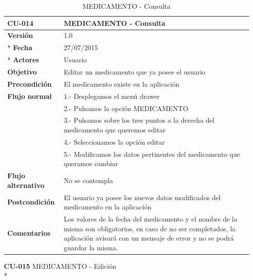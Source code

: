 \documentclass[../pfc.tex]{subfiles}
\begin{document}
		\begin{table}[H]
			\centering
			\begin{tabular}[t]{|p{3cm}|p{9.5cm}|}
				\hline \textbf{CU-014} & \textbf{MEDICAMENTO - Consulta} \\*
				\hline\hline \textbf{Versión} & 1.0 \\ *
				\hline\hline \textbf{Fecha} & 27/07/2015 \\ *
				\hline\textbf{Actores} 	& Usuario\\*
				\hline \textbf{Objetivo} & Editar un medicamento que ya posee el usuario\\* 			
				\hline \textbf{Precondición} & El medicamento existe en la aplicación\\* 
				\hline \textbf{Flujo normal} & 1.- Desplegamos el menú drawer \\* 
				& 2.- Pulsamos la opción MEDICAMENTO\\*	
				& 3.- Pulsamos sobre los tres puntos a la derecha del medicamento que queremos editar\\*	
				& 4.- Seleccionamos la opción editar\\*	
				& 5.- Modificamos los datos pertinentes del medicamento que queramos cambiar\\*	
				\hline \textbf{Flujo alternativo} & No se contempla \\* 
				\hline \textbf{Postcondición} & El usuario ya posee los nuevos datos modificados del medicamento en la aplicación \\* 
				\hline \textbf{Comentarios}   & Los valores de la fecha del medicamento y el nombre de la misma son obligatorios, en caso de no ser completados, la aplicación avisará con un mensaje de error y no se podrá guardar la misma.\\*
				\hline
			\end{tabular}
			\caption{MEDICAMENTO - Consulta}
			\label{tabla:caso014}
		\end{table}
		
		\textbf{CU-015}	MEDICAMENTO - Edición\\*
		
\end{document}
